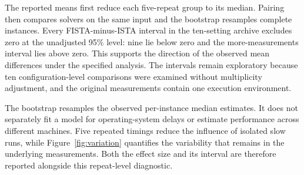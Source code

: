 \documentclass{article}
\begin{document}
The reported means first reduce each five-repeat group to its median. Pairing then compares solvers on the same input and the bootstrap resamples complete instances. Every FISTA-minus-ISTA interval in the ten-setting archive excludes zero at the unadjusted 95\% level: nine lie below zero and the more-measurements interval lies above zero. This supports the direction of the observed mean differences under the specified analysis. The intervals remain exploratory because ten configuration-level comparisons were examined without multiplicity adjustment, and the original measurements contain one execution environment.

The bootstrap resamples the observed per-instance median estimates. It does not separately fit a model for operating-system delays or estimate performance across different machines. Five repeated timings reduce the influence of isolated slow runs, while Figure~\ref{fig:variation} quantifies the variability that remains in the underlying measurements. Both the effect size and its interval are therefore reported alongside this repeat-level diagnostic.
\end{document}
